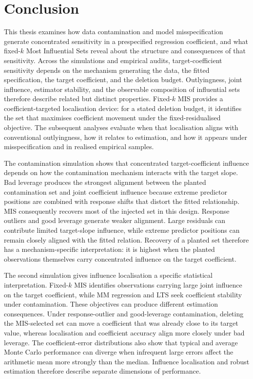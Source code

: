 \documentclass[../main.tex]{subfiles}
\begin{document}
\section{Conclusion}
\label{sec:conclusion}

This thesis examines how data contamination and model misspecification generate concentrated sensitivity in a prespecified regression coefficient, and what fixed-\(k\) Most Influential Sets reveal about the structure and consequences of that sensitivity. Across the simulations and empirical audits, target-coefficient sensitivity depends on the mechanism generating the data, the fitted specification, the target coefficient, and the deletion budget. Outlyingness, joint influence, estimator stability, and the observable composition of influential sets therefore describe related but distinct properties. Fixed-\(k\) MIS provides a coefficient-targeted localisation device: for a stated deletion budget, it identifies the set that maximises coefficient movement under the fixed-residualised objective. The subsequent analyses evaluate when that localisation aligns with conventional outlyingness, how it relates to estimation, and how it appears under misspecification and in realised empirical samples.

The contamination simulation shows that concentrated target-coefficient influence depends on how the contamination mechanism interacts with the target slope. Bad leverage produces the strongest alignment between the planted contamination set and joint coefficient influence because extreme predictor positions are combined with response shifts that distort the fitted relationship. MIS consequently recovers most of the injected set in this design. Response outliers and good leverage generate weaker alignment. Large residuals can contribute limited target-slope influence, while extreme predictor positions can remain closely aligned with the fitted relation. Recovery of a planted set therefore has a mechanism-specific interpretation: it is highest when the planted observations themselves carry concentrated influence on the target coefficient.

The second simulation gives influence localisation a specific statistical interpretation. Fixed-\(k\) MIS identifies observations carrying large joint influence on the target coefficient, while MM regression and LTS seek coefficient stability under contamination. These objectives can produce different estimation consequences. Under response-outlier and good-leverage contamination, deleting the MIS-selected set can move a coefficient that was already close to its target value, whereas localisation and coefficient accuracy align more closely under bad leverage. The coefficient-error distributions also show that typical and average Monte Carlo performance can diverge when infrequent large errors affect the arithmetic mean more strongly than the median. Influence localisation and robust estimation therefore describe separate dimensions of performance.
\end{document}
